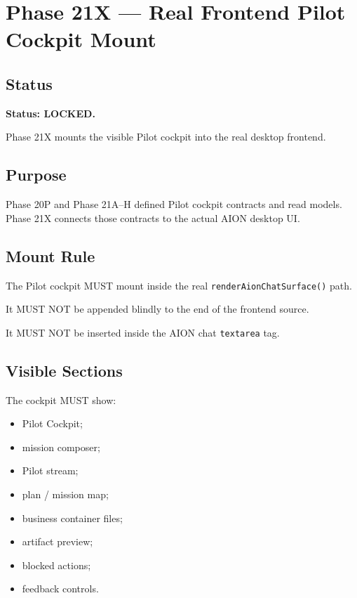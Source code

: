 \section{Phase 21X --- Real Frontend Pilot Cockpit Mount}
\label{sec:aion-phase21x-real-frontend-pilot-cockpit-mount}

\subsection{Status}

\textbf{Status: LOCKED.}

Phase 21X mounts the visible Pilot cockpit into the real desktop frontend.

\subsection{Purpose}

Phase 20P and Phase 21A--H defined Pilot cockpit contracts and read models. Phase 21X connects those contracts to the actual AION desktop UI.

\subsection{Mount Rule}

The Pilot cockpit MUST mount inside the real \texttt{renderAionChatSurface()} path.

It MUST NOT be appended blindly to the end of the frontend source.

It MUST NOT be inserted inside the AION chat \texttt{textarea} tag.

\subsection{Visible Sections}

The cockpit MUST show:

\begin{itemize}
  \item Pilot Cockpit;
  \item mission composer;
  \item Pilot stream;
  \item plan / mission map;
  \item business container files;
  \item artifact preview;
  \item blocked actions;
  \item feedback controls.
\end{itemize}

